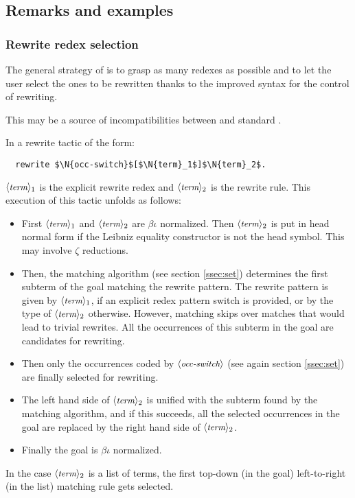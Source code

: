 \subsection{Remarks and examples}\label{ssec:rwex}

\subsubsection*{Rewrite redex selection}
The general strategy of \ssr{}
is to grasp as many redexes as possible and to let the user select the
ones to be rewritten thanks to the improved syntax for the control of
rewriting.

This may be a source of incompatibilities between \ssr{} and standard
\Coq{}.

In a rewrite tactic of the form:
\begin{lstlisting}
  rewrite $\N{occ-switch}$[$\N{term}_1$]$\N{term}_2$.
\end{lstlisting}
$\langle\mbox{\itshape\rmfamily\small term}\rangle_1$ is the explicit rewrite redex and
$\langle\mbox{\itshape\rmfamily\small term}\rangle_2$ is the
rewrite rule. This execution of this tactic unfolds as follows:

\begin{itemize}
\item First $\langle\mbox{\itshape\rmfamily\small term}\rangle_1$ and $\langle\mbox{\itshape\rmfamily\small term}\rangle_2$ are $\beta\iota$ normalized. Then
  $\langle\mbox{\itshape\rmfamily\small term}\rangle_2$ is put in head normal form if the Leibniz equality
  constructor  is not the head symbol. This may involve $\zeta$
  reductions.
\item Then, the matching algorithm (see section \ref{ssec:set})
  determines the first subterm of the goal matching the rewrite pattern.
  The rewrite pattern is
  given by $\langle\mbox{\itshape\rmfamily\small term}\rangle_1$, if an explicit redex pattern switch is provided, or by
  the type of $\langle\mbox{\itshape\rmfamily\small term}\rangle_2$ otherwise. However, matching skips over
  matches that would lead to trivial rewrites. All the
  occurrences of this subterm in the goal are candidates for rewriting.
\item Then only the occurrences coded by $\langle\mbox{\itshape\rmfamily\small occ-switch}\rangle$ (see again
  section \ref{ssec:set}) are finally selected for rewriting.
\item The left hand side of $\langle\mbox{\itshape\rmfamily\small term}\rangle_2$ is unified with the subterm found
  by the matching algorithm, and if this succeeds, all the selected
  occurrences in the goal are replaced by the right hand side of
  $\langle\mbox{\itshape\rmfamily\small term}\rangle_2$.
\item Finally the goal is $\beta\iota$ normalized.
\end{itemize}

In the case $\langle\mbox{\itshape\rmfamily\small term}\rangle_2$ is a list of terms, the first top-down (in
the goal) left-to-right (in the list) matching rule gets selected.

